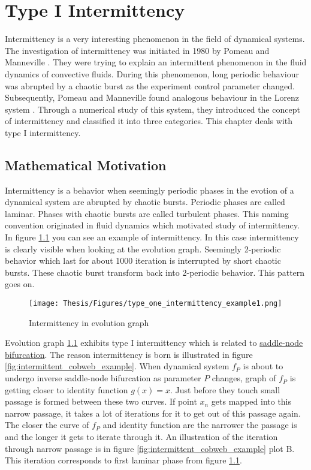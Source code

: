 \chapter{Type I Intermittency}
Intermittency is a very interesting phenomenon in the field of dynamical systems.
The investigation of intermittency was initiated in 1980 by Pomeau and Manneville \cite{Pomeau1980}.
They were trying to explain an intermittent phenomenon in the fluid dynamics of convective fluids.
During this phenomenon, long periodic behaviour was abrupted by a chaotic burst as the experiment control parameter changed.
Subsequently, Pomeau and Manneville found analogous behaviour in the Lorenz system \cite{Lorenz2004}.
Through a numerical study of this system, they introduced the concept of intermittency and classified it into three categories. \cite{Pomeau1980}
This chapter deals with type I intermittency.

\section{Mathematical Motivation}

Intermittency is a behavior when seemingly periodic phases in the evotion of a dynamical system are abrupted by chaotic bursts.
Periodic phases are called laminar.
Phases with chaotic bursts are called turbulent phases.
This naming convention originated in fluid dynamics which motivated study of intermittency. \cite{Pomeau1980}
\\
In figure \ref{fig:intermittent_evolution_example} you can see an example of intermittency.
In this case intermittency is clearly visible when looking at the evolution graph.
Seemingly 2-periodic behavior which last for about 1000 iteration is interrupted by short chaotic bursts.
These chaotic burst transform back into 2-periodic behavior.
This pattern goes on.

\begin{figure}[!h]
    \centering
    \texttt{[image: Thesis/Figures/type\_one\_intermittency\_example1.png]}
    \caption{Intermittency in evolution graph}
    \label{fig:intermittent_evolution_example}
\end{figure}

Evolution graph \ref{fig:intermittent_evolution_example} exhibits type I intermittency which is related to \hyperref[def:saddle_node_bif]{saddle-node bifurcation}.
The reason intermittency is born is illustrated in figure \ref{fig:intermittent_cobweb_example}.
When dynamical system $f_P$ is about to undergo inverse saddle-node bifurcation as parameter $P$ changes, graph of $f_P$ is getting closer to identity function $g(x)=x$.
Just before they touch small passage is formed between these two curves.
If point $x_n$ gets mapped into this narrow passage, it takes a lot of iterations for it to get out of this passage again.
The closer the curve of $f_P$ and identity function are the narrower the passage is and the longer it gets to iterate through it.
An illustration of the iteration through narrow passage is in figure \ref{fig:intermittent_cobweb_example} plot B.
This iteration corresponds to first laminar phase from figure \ref{fig:intermittent_evolution_example}.

